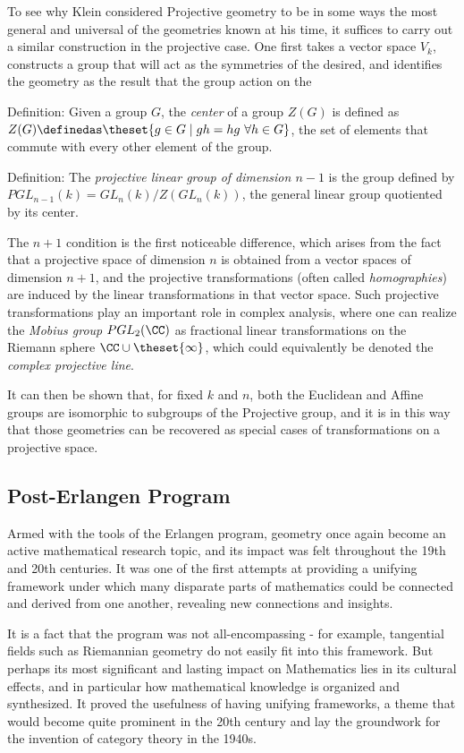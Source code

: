 \documentclass[]{article}
\begin{document}
To see why Klein considered Projective geometry to be in some ways the
most general and universal of the geometries known at his time, it
suffices to carry out a similar construction in the projective case. One
first takes a vector space \(V_k\), constructs a group that will act as
the symmetries of the desired, and identifies the geometry as the result
that the group action on the

Definition: Given a group \(G\), the \emph{center} of a group \(Z(G)\)
is defined as
\(Z(G) \definedas \theset{g\in G \mid gh = hg ~\forall h\in G}\), the
set of elements that commute with every other element of the group.

Definition: The \emph{projective linear group of dimension \(n-1\)} is
the group defined by \(PGL_{n-1}(k) = GL_n(k) / Z(GL_n(k))\), the
general linear group quotiented by its center.

The \(n+1\) condition is the first noticeable difference, which arises
from the fact that a projective space of dimension \(n\) is obtained
from a vector spaces of dimension \(n+1\), and the projective
transformations (often called \emph{homographies}) are induced by the
linear transformations in that vector space. Such projective
transformations play an important role in complex analysis, where one
can realize the \emph{Mobius group} \(PGL_2(\CC)\) as fractional linear
transformations on the Riemann sphere \(\CC \cup \theset{\infty}\),
which could equivalently be denoted the \emph{complex projective line}.

It can then be shown that, for fixed \(k\) and \(n\), both the Euclidean
and Affine groups are isomorphic to subgroups of the Projective group,
and it is in this way that those geometries can be recovered as special
cases of transformations on a projective space.

\subsection{Post-Erlangen Program}\label{header-n98}

Armed with the tools of the Erlangen program, geometry once again become
an active mathematical research topic, and its impact was felt
throughout the 19th and 20th centuries. It was one of the first attempts
at providing a unifying framework under which many disparate parts of
mathematics could be connected and derived from one another, revealing
new connections and insights.

It is a fact that the program was not all-encompassing - for example,
tangential fields such as Riemannian geometry do not easily fit into
this framework. But perhaps its most significant and lasting impact on
Mathematics lies in its cultural effects, and in particular how
mathematical knowledge is organized and synthesized. It proved the
usefulness of having unifying frameworks, a theme that would become
quite prominent in the 20th century and lay the groundwork for the
invention of category theory in the 1940s.
\end{document}
